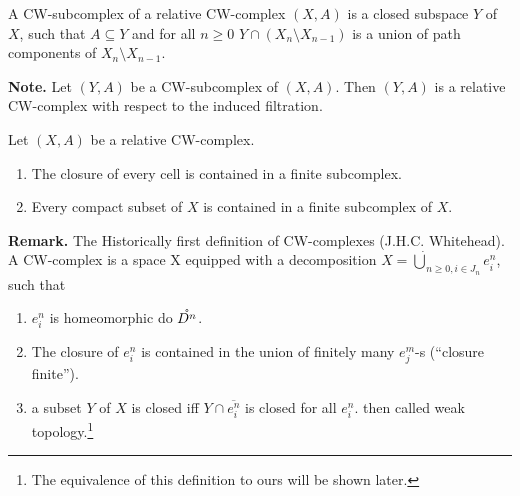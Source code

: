 \documentclass{TemplateLecture}
\begin{document}
\begin{defi}{}{}
    A CW-subcomplex of a relative CW-complex \((X,A)\) is a closed subspace \(Y\) of \(X\), such that \(A \subseteq Y\) and for all \(n \geq 0\) \(Y \cap (X_n\setminus{X_{n-1}})\) is a union of path components of \(X_n\setminus X_{n-1}\).
\end{defi}

\textbf{Note.} Let \((Y,A)\) be a CW-subcomplex of \((X,A)\). Then \((Y,A)\) is a relative CW-complex with respect to the induced filtration.

\begin{thm}{}{}
    Let \((X,A)\) be a relative CW-complex.
    \begin{enumerate}
        \item The closure of every cell is contained in a finite subcomplex.
        \item Every compact subset of \(X\) is contained in a finite subcomplex of \(X\).
    \end{enumerate}
\end{thm}

\textbf{Remark.} The Historically first definition of CW-complexes (J.H.C. Whitehead). A CW-complex is a space X equipped with a decomposition \(X = \dot\bigcup_{n \geq 0, i \in J_n} e_i^n\), such that
\begin{enumerate}
    \item \(e_i^n\) is homeomorphic do \(\mathring{D^n}\).
    \item The closure of \(e_i^n\) is contained in the union of finitely many \(e^m_j\)-s (\enquote{closure finite}).
    \item a subset \(Y\) of \(X\) is closed iff \(Y \cap \overline{e_i^n}\) is closed for all \(e_i^n\). then called weak topology.\footnote{The equivalence of this definition to ours will be shown later.}
\end{enumerate}
\end{document}
